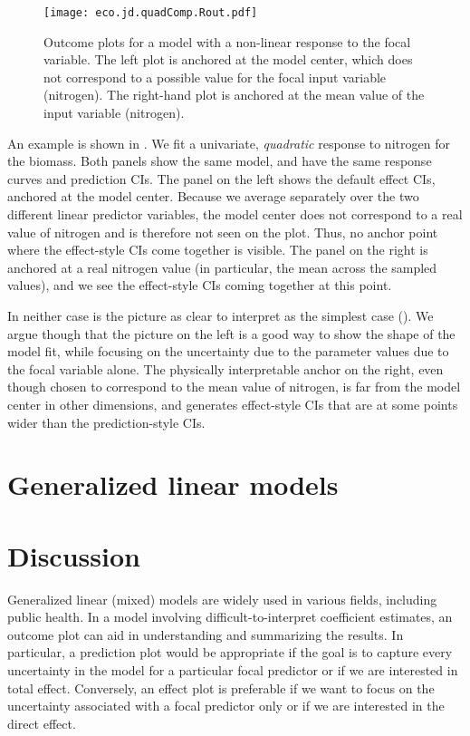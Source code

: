 \begin{figure}
\begin{center}
\texttt{[image: eco.jd.quadComp.Rout.pdf]}
\end{center}
\caption{Outcome plots for a model with a non-linear response to the focal variable. The left plot is anchored at the model center, which does not correspond to a possible value for the focal input variable (nitrogen). The right-hand plot is anchored at the mean value of the input variable (nitrogen). }
\end{figure}

An example is shown in . We fit a univariate, \emph{quadratic} response to nitrogen for the biomass. Both panels show the same model, and have the same response curves and prediction CIs. The panel on the left shows the default effect CIs, anchored at the model center.
Because we average separately over the two different linear predictor variables, 
the model center does not correspond to a real value of nitrogen and is therefore not seen on the plot. 
Thus, no anchor point where the effect-style CIs come together is visible. 
The panel on the right is anchored at a real nitrogen value (in particular, the mean across the sampled values), and we see the effect-style CIs coming together at this point.

In neither case is the picture as clear to interpret as the simplest case (). We argue though that the picture on the left is a good way to show the shape of the model fit, while focusing on the uncertainty due to the parameter values due to the focal variable alone. The physically interpretable anchor on the right, even though chosen to correspond to the mean value of nitrogen, is far from the model center in other dimensions, and generates effect-style CIs that are at some points wider than the prediction-style CIs.

\section{Generalized linear models}

\section{Discussion}

Generalized linear (mixed) models are widely used in various fields, including public health. In a model involving difficult-to-interpret coefficient estimates, an outcome plot can aid in understanding and summarizing the results. In particular, a prediction plot would be appropriate if the goal is to capture every uncertainty in the model for a particular focal predictor or if we are interested in total effect. Conversely, an effect plot is preferable if we want to focus on the uncertainty associated with a focal predictor only or if we are interested in the direct effect.

